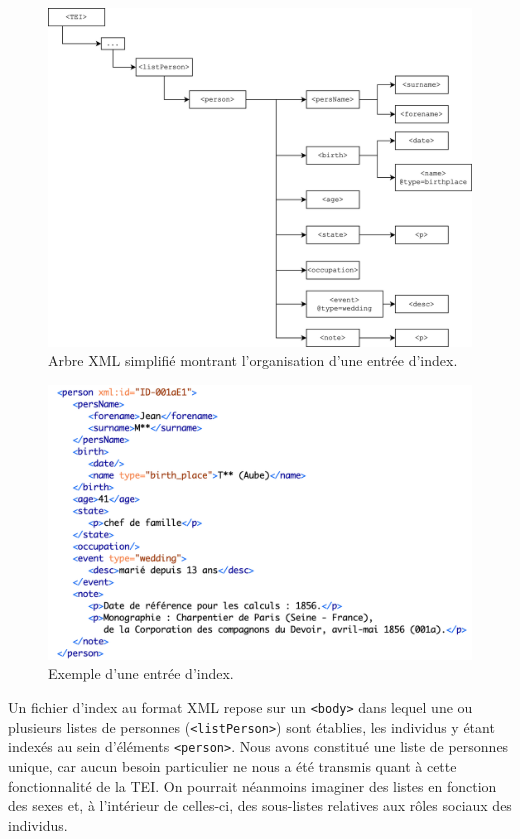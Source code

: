 \begin{figure}[ht]
    \centering
    \includegraphics[width=16cm]{img/schema_index.png}
    \caption{Arbre XML simplifié montrant l'organisation d'une entrée d'index.}
    \label{fig:index_tree}
\end{figure}

\begin{figure}
    \centering
    \includegraphics[width=16cm]{img/entree_index.png}
    \caption{Exemple d'une entrée d'index.}
    \label{fig:entree_index}
\end{figure}

Un fichier d'index au format XML repose sur un \texttt{<body>} dans lequel une ou plusieurs listes de personnes (\texttt{<listPerson>}) sont établies, les individus y étant indexés au sein d'éléments \texttt{<person>}. Nous avons constitué une liste de personnes unique, car aucun besoin particulier ne nous a été transmis quant à cette fonctionnalité de la TEI. On pourrait néanmoins imaginer des listes en fonction des sexes et, à l'intérieur de celles-ci, des sous-listes relatives aux rôles sociaux des individus. 

